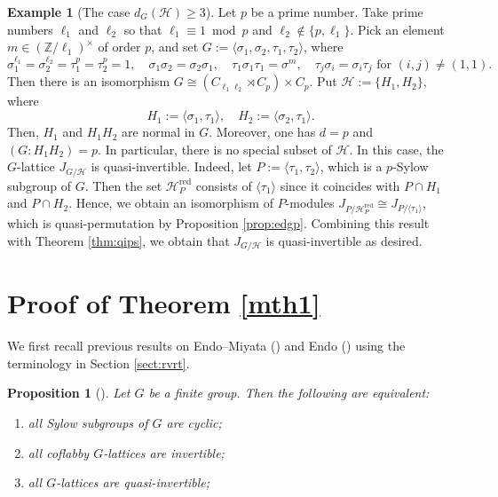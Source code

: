 \documentclass[12pt]{amsart}
\theoremstyle{plain}
\newtheorem{prop}[thm]{Proposition}
\theoremstyle{definition}
\newtheorem{ex}[thm]{Example}
\numberwithin{thm}{section}
\numberwithin{equation}{section}
\newcommand{\Z}{\mathbb{Z}}
\newcommand{\cH}{\mathcal{H}}
\DeclareMathOperator{\red}{red}
\begin{document}
\begin{ex}[{The case $d_{G}(\cH)\geq 3$}]
Let $p$ be a prime number. Take prime numbers $\ell_{1}$ and $\ell_{2}$ so that $\ell_{1}\equiv 1\bmod p$ and $\ell_{2}\notin \{p,\ell_{1}\}$. Pick an element $m\in (\Z/\ell_{1})^{\times}$ of order $p$, and set $G:=\langle \sigma_{1},\sigma_{2},\tau_{1},\tau_{2}\rangle$, where
\begin{equation*}
    \sigma_{1}^{\ell_{1}}=\sigma_{2}^{\ell_{2}}=\tau_{1}^{p}=\tau_{2}^{p}=1,\quad \sigma_{1}\sigma_{2}=\sigma_{2}\sigma_{1},\quad \tau_{1}\sigma_{1}\tau_{1}=\sigma^{m},\quad \tau_{j}\sigma_{i}=\sigma_{i}\tau_{j}\text{ for }(i,j)\neq (1,1). 
\end{equation*}
Then there is an isomorphism $G\cong (C_{\ell_{1}\ell_{2}}\rtimes C_{p})\times C_{p}$. Put $\cH:=\{H_{1},H_{2}\}$, where
\begin{equation*}
    H_{1}:=\langle \sigma_{1}, \tau_{1}\rangle,\quad 
    H_{2}:=\langle \sigma_{2}, \tau_{1}\rangle. 
\end{equation*}
Then, $H_{1}$ and $H_{1}H_{2}$ are normal in $G$. Moreover, one has $d=p$ and $(G:H_{1}H_{2})=p$. In particular, there is no special subset of $\cH$. In this case, the $G$-lattice $J_{G/\cH}$ is quasi-invertible. Indeed, let $P:=\langle \tau_{1},\tau_{2}\rangle$, which is a $p$-Sylow subgroup of $G$. Then the set $\cH_{P}^{\red}$ consists of $\langle \tau_{1} \rangle$ since it coincides with $P\cap H_{1}$ and $P\cap H_{2}$. Hence, we obtain an isomorphism of $P$-modules $J_{P/\cH_{P}^{\red}}\cong J_{P/\langle \tau_{1}\rangle}$, which is quasi-permutation by Proposition \ref{prop:edgp}. Combining this result with Theorem \ref{thm:qips}, we obtain that $J_{G/\cH}$ is quasi-invertible as desired. 
\end{ex}

\section{Proof of Theorem \ref{mth1}}\label{sect:pfzg}

We first recall previous results on Endo--Miyata (\cite{Endo1975}) and Endo (\cite{Endo2011}) using the terminology in Section \ref{sect:rvrt}. 

\begin{prop}[{\cite[Theorem 1.5]{Endo1975}}]\label{prop:emqi}
Let $G$ be a finite group. Then the following are equivalent: 
\begin{enumerate}
\item all Sylow subgroups of $G$ are cyclic; 
\item all coflabby $G$-lattices are invertible; 
\item all $G$-lattices are quasi-invertible; 
\end{enumerate}
\end{prop}
\end{document}
